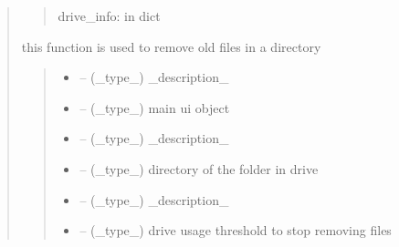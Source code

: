 \documentclass[letterpaper,10pt,english]{sphinxmanual}
\begin{document}
\begin{quote}
\begin{savenotes}
\begin{fulllineitems}
\begin{quote}
\begin{description}
\sphinxAtStartPar
drive\_info: in dict

\end{description}\end{quote}

\end{fulllineitems}\end{savenotes}


\begin{savenotes}\begin{fulllineitems}
\label{\detokenize{setting/backend/storage_funcs:oxin.backend.storage_funcs.remove_old_files_in_directory}}
\pysigstartsignatures
{}
\pysigstopsignatures
\sphinxAtStartPar
this function is used to remove old files in a directory
\begin{quote}\begin{description}
\begin{itemize}
\item {} 
\sphinxAtStartPar
{} – (\_type\_) \_description\_

\item {} 
\sphinxAtStartPar
{} – (\_type\_) main ui object

\item {} 
\sphinxAtStartPar
{} – (\_type\_) \_description\_

\item {} 
\sphinxAtStartPar
{} – (\_type\_) directory of the folder in drive

\item {} 
\sphinxAtStartPar
{} – (\_type\_) \_description\_

\item {} 
\sphinxAtStartPar
{} – (\_type\_) drive usage threshold to stop removing files


\end{itemize}
\end{description}
\end{quote}
\end{fulllineitems}
\end{savenotes}
\end{quote}
\end{document}

